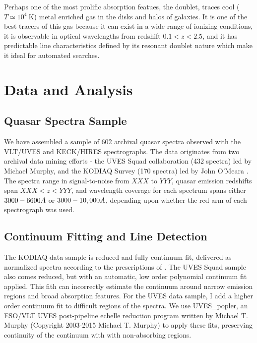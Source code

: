 \message{ !name(Paper_v1.tex)}\documentclass[iop,apj,numberedappendix,appendixfloats,twocolappendix]{emulateapj}
\begin{document}
Perhaps one of the most prolific absorption featues, the {\MgIIdblt} doublet, traces cool ($T \simeq 10^4~\mathrm{K}$) metal enriched gas in the disks and halos of galaxies. It is one of the best tracers of this gas because it can exist in a wide range of ionizing conditions, it is observable in optical wavelengths from redshift $0.1 < z < 2.5$, and it has predictable line characteristics defined by its resonant doublet nature which make it ideal for automated searches. 




\section{Data and Analysis}
\label{sec:data}

\subsection{Quasar Spectra Sample}

We have assembled a sample of 602 archival quasar spectra observed with the VLT/UVES and KECK/HIRES spectrographs. The data originates from two archival data mining efforts - the UVES Squad collaboration (432 spectra) led by Michael Murphy, and the KODIAQ Survey (170 spectra) led by John O'Meara \citep{OMeara2015}. The spectra range in signal-to-noise from $XXX$ to $YYY$, quasar emission redshifts span $XXX < z < YYY$, and wavelength coverage for each spectrum spans either $3000 - 6600\AA$ or $3000 - 10,000\AA$, depending upon whether the red arm of each spectrograph was used.


\subsection{Continuum Fitting and Line Detection}
\label{sec:detection}

The KODIAQ data sample is reduced and fully continuum fit, delivered as normalized spectra according to the prescriptions of \cite{OMeara2015}. The UVES Squad sample also comes reduced, but with an automatic, low order polynomial continuum fit applied. This fith can incorrectly estimate the continuum around narrow emission regions and broad absorption features. For the UVES data sample, I add a higher order continuum fit to difficult regions of the spectra. We use UVES\_popler, an ESO/VLT UVES post-pipeline echelle reduction program written by Michael T. Murphy (Copyright 2003-2015 Michael T. Murphy) to apply these fits, preserving continuity of the continuum with with non-absorbing regions. 
\end{document}
